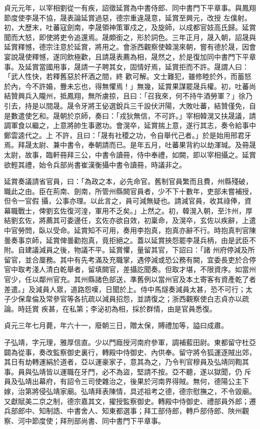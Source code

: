 \begin{pinyinscope}
 貞元元年，以宰相劉從一有疾，詔徵延賞為中書侍郎、同中書門下平章事。與鳳翔節度使李晟不協，晟表論延賞過惡，德宗重違晟意，延賞至興元，改授
 左僕射。初，大歷末，吐蕃寇劍南，李晟領神策軍戍之，及旋師，以成都官妓高氏歸。延賞聞而大怒，即使將吏令追還焉。晟頗銜之，形於詞色。三年正月，晟入朝，詔晟與延賞釋憾，德宗注意於延賞，將用之。會浙西觀察使韓滉來朝，嘗有德於晟，因會宴說晟使釋憾，遂同飲極歡，且請晟表薦為相，晟然之，於是復加同中書門下平章事。及延賞當國用事，晟請一子聘其女，固情好焉，延賞拒而不許。晟謂人曰：「武人性快，若釋舊惡於杯酒之間，終
 歡可解。文士難犯，雖修睦於外，而蓄怒於內，今不許婚，釁未忘也，得無懼焉！」無幾，延賞果謀罷晟兵權。初，吐蕃尚結贊興兵入隴州，抵鳳翔，無所虜掠，且曰：「召我來，何不持牛酒勞軍？」徐乃引去，持是以間晟。晟令牙將王佖選銳兵三千設伏汧陽，大敗吐蕃，結贊僅免，自是數遣使乞和。晟朝於京師，奏曰：「戎狄無信，不可許。」宰相韓滉又扶晟議，請調軍食以繼之，上意將帥生事邀功。會滉卒，延賞揣上意，遂行其志，奏令給事中鄭雲逵代之。上
 不許，且曰：「晟有社稷之功，令自舉代己者。」於是始用邢君牙焉。拜晟太尉、兼中書令，奉朝請而已。是年五月，吐蕃果背約以劫渾瑊。及冊晟太尉，故事，臨軒冊拜三公，中書令讀冊，侍中奉禮，如闕，即以宰相攝之。延賞欲輕其禮，始令兵部尚書崔漢衡攝中書令讀冊，時議非之。



 延賞奏議請省官員，曰：「為政之本，必先命官。舊制官員繁而且費，州縣殘破，職此之由。臣在荊南、劍南，所管州縣闕官員者，少不下十數年，吏部未嘗補授，但令一官假
 攝，公事亦理。以此言之，員可減無疑也。請減官員，收其祿俸，資幕職戰士，俾劉玄佐復河湟，軍用不乏矣。」上然之。初，韓滉入朝，至汴州，厚結劉玄佐，將薦其可委邊任，玄佐亦欲自效，初稟命，及滉卒，玄佐以疾辭，上遣中官勞問，臥以受命。延賞知不可用，奏用李抱真，抱真亦辭不行。時抱真判官陳曇奏事京師，延賞俾曇勸抱真，竟拒絕之。蓋以延賞挾怨罷李晟兵柄，由是武臣不附。自建議減員之後，物議不平。延賞懼，量留其官，下詔曰：「諸
 州府停減及所留官，並合厘務。其中有先考滿及充職掌，遇停減或恐公務有闕，宜委長吏於合停官中取考淺人清白乾舉者，留填闕官，差攝訖聞奏。但取才堪，不限資序。如當州官少，任以鄰州官充。其州縣諸色部送，準舊例以當州官及本土寄客有資產乾了者差遣。」及減員人眾，道路怨嘆，日聞於上。侍中馬燧奏減員太甚，恐不可行；太子少保韋倫及常參官等各抗疏以減員招怨，並請復之；浙西觀察使白志貞亦以疏論。時廷賞
 疾甚，在私第；李泌初為相，採於群情，由是官員悉復。



 貞元三年七月薨，年六十一，廢朝三日，贈太保，賻禮加等，謚曰成肅。



 子弘靖，字元理，雅厚信直。少以門廕授河南府參軍，調補藍田尉。東都留守杜亞闢為從事，奏改監察御史裏行，轉殿中侍御史、內供奉。留守將令狐運逐賊出郊，其日有劫轉運絹於道者，亞以運豪家子，意其為之，乃令判官穆員及弘靖同鞫其事。員與弘靖皆以運職在牙門，必不為盜，堅請不按。亞不聽，遂以獄聞，仍
 斥員及弘靖出幕府，有詔令三司使雜治之，後果於河南界得賊。無何，德陽公主下嫁，治第將侵弘靖家廟。弘靖拜表陳情，具述祖考之德，德宗慰撫之，不令毀廟。又獻賦美二京之制，德宗嘉其文，擢授監察御史。轉殿中侍御史、禮部員外郎；遷兵部郎中、知制誥、中書舍人、知東都選事；拜工部侍郎，轉戶部侍郎、陜州觀察、河中節度使；拜刑部尚書、同中書門下平章事。




\end{pinyinscope}
